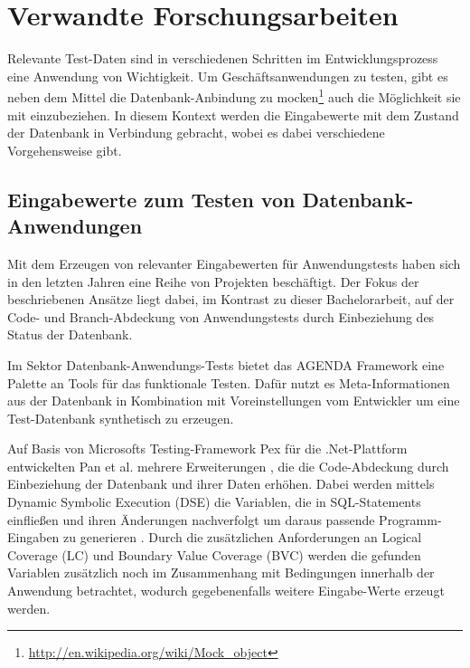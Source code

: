 \section{Verwandte Forschungsarbeiten}\label{chap:relatedwork}

%
%

Relevante Test-Daten sind in verschiedenen Schritten im Entwicklungsprozess eine Anwendung von Wichtigkeit.
Um Geschäftsanwendungen zu testen, gibt es neben dem Mittel die Datenbank-Anbindung zu mocken\footnote{\url{http://en.wikipedia.org/wiki/Mock_object}} auch die Möglichkeit sie mit einzubeziehen.
In diesem Kontext werden die Eingabewerte mit dem Zustand der Datenbank in Verbindung gebracht, wobei es dabei verschiedene Vorgehensweise gibt.

\subsection{Eingabewerte zum Testen von Datenbank-Anwendungen}
Mit dem Erzeugen von relevanter Eingabewerten für Anwendungstests haben sich in den letzten Jahren eine Reihe von Projekten beschäftigt.
Der Fokus der beschriebenen Ansätze liegt dabei, im Kontrast zu dieser Bachelorarbeit, auf der Code- und Branch-Abdeckung von Anwendungstests durch Einbeziehung des Status der Datenbank.

Im Sektor Datenbank-Anwendungs-Tests bietet das AGENDA Framework \cite{Chays:2000:FTD:347324.348954, Chays:2004:TDG:997669, Chays:2004:ATR:1077269.1077271, Deng:2005:TDT:1062455.1062486, Chays:2008:QTG:1385269.1385277} eine Palette an Tools für das funktionale Testen.
Dafür nutzt es Meta-Informationen aus der Datenbank in Kombination mit Voreinstellungen vom Entwickler um eine Test-Datenbank synthetisch zu erzeugen.

Auf Basis von Microsofts Testing-Framework Pex für die .Net-Plattform \cite{Tillmann:2008:PWB:1792786.1792798} entwickelten Pan et al. mehrere Erweiterungen \cite{Pan:2011:GPI:2190078.2190154, Pan:2011:DSG:1988842.1988846}, die die Code-Abdeckung durch Einbeziehung der Datenbank und ihrer Daten erhöhen.
Dabei werden mittels Dynamic Symbolic Execution (DSE) \cite{Cadar:2006:EAG:1180405.1180445, Godefroid:2005:DDA:1065010.1065036} die Variablen, die in SQL-Statements einfließen und ihren Änderungen nachverfolgt um daraus passende Programm-Eingaben zu generieren \cite{Pan:2011:GPI:2190078.2190154}.
Durch die zusätzlichen Anforderungen an Logical Coverage (LC) \cite{DBLP:conf/issre/AmmannOH03} und Boundary Value Coverage (BVC) \cite{DBLP:conf/issre/KosmatovLPU04} werden die gefunden Variablen zusätzlich noch im Zusammenhang mit Bedingungen innerhalb der Anwendung betrachtet, wodurch gegebenenfalls weitere Eingabe-Werte erzeugt werden. 

